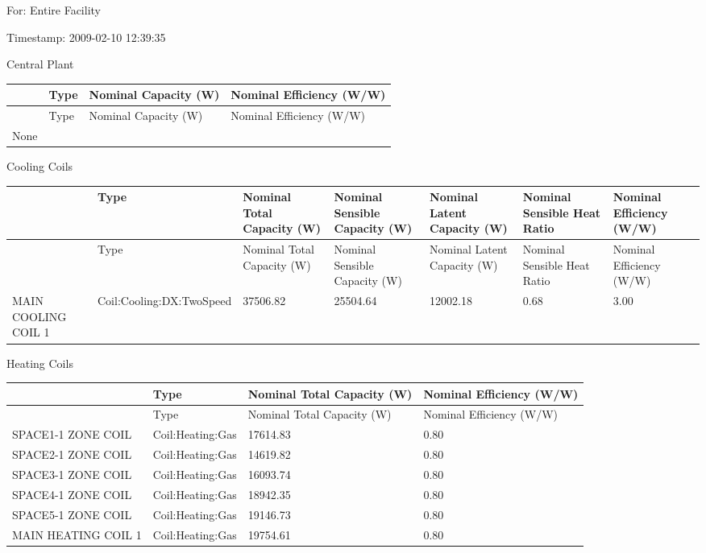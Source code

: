 For: Entire Facility

Timestamp: 2009-02-10 12:39:35

Central Plant

\begin{longtable}[c]{@{}llll@{}}
\toprule 
~ & Type & Nominal Capacity (W) & Nominal Efficiency (W/W) \tabularnewline
\midrule
\endfirsthead

\toprule 
~ & Type & Nominal Capacity (W) & Nominal Efficiency (W/W) \tabularnewline
\midrule
\endhead

None & ~ & ~ & ~ \tabularnewline
\bottomrule
\end{longtable}

Cooling Coils

{\scriptsize
\begin{longtable}[c]{>{\raggedright}p{0.85in}>{\raggedright}p{0.85in}>{\raggedright}p{0.85in}>{\raggedright}p{0.85in}>{\raggedright}p{0.85in}>{\raggedright}p{0.85in}>{\raggedright}p{0.85in}}
\toprule 
~ & Type & Nominal Total Capacity (W) & Nominal Sensible Capacity (W) & Nominal Latent Capacity (W) & Nominal Sensible Heat Ratio & Nominal Efficiency (W/W) \tabularnewline
\midrule
\endfirsthead

\toprule 
~ & Type & Nominal Total Capacity (W) & Nominal Sensible Capacity (W) & Nominal Latent Capacity (W) & Nominal Sensible Heat Ratio & Nominal Efficiency (W/W) \tabularnewline
\midrule
\endhead

MAIN COOLING COIL 1 & Coil:\-Cooling:\-DX:\-TwoSpeed & 37506.82 & 25504.64 & 12002.18 & 0.68 & 3.00 \tabularnewline
\bottomrule
\end{longtable}}

Heating Coils

{\scriptsize
\begin{longtable}[c]{>{\raggedright}p{1.5in}>{\raggedright}p{1.5in}>{\raggedright}p{1.5in}>{\raggedright}p{1.5in}}
\toprule 
~ & Type & Nominal Total Capacity (W) & Nominal Efficiency (W/W) \tabularnewline
\midrule
\endfirsthead

\toprule 
~ & Type & Nominal Total Capacity (W) & Nominal Efficiency (W/W) \tabularnewline
\midrule
\endhead

SPACE1-1 ZONE COIL & Coil:Heating:Gas & 17614.83 & 0.80 \tabularnewline
SPACE2-1 ZONE COIL & Coil:Heating:Gas & 14619.82 & 0.80 \tabularnewline
SPACE3-1 ZONE COIL & Coil:Heating:Gas & 16093.74 & 0.80 \tabularnewline
SPACE4-1 ZONE COIL & Coil:Heating:Gas & 18942.35 & 0.80 \tabularnewline
SPACE5-1 ZONE COIL & Coil:Heating:Gas & 19146.73 & 0.80 \tabularnewline
MAIN HEATING COIL 1 & Coil:Heating:Gas & 19754.61 & 0.80 \tabularnewline
\bottomrule
\end{longtable}}

